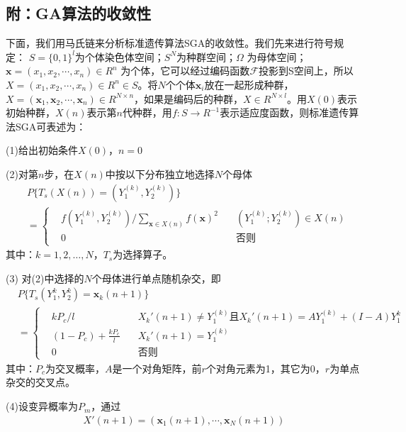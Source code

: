    \subsection{附：GA算法的收敛性}
        \par
        下面，我们用马氏链来分析标准遗传算法SGA的收敛性。我们先来进行符号规定：
        $S={\{0,1\}}^l$为个体染色体空间；$S^N$为种群空间；$\Omega$ 为母体空间；$\mathbf{x}=(x_1,x_2,\cdots,x_n)\in R^n$ 为个体，它可以经过编码函数$\mathcal{F}$投影到S空间上，所以$X=(x_1,x_2,\cdots,x_n)\in R^n\in S$。将$N$个个体$\mathbf{x}_i$放在一起形成种群，$X=(\mathbf{x}_1,\mathbf{x}_2,\cdots,\mathbf{x}_n)\in R^{N\times n}$，如果是编码后的种群，$X\in R^{N\times l}$。用$X(0)$表示初始种群，$X(n)$表示第$n$代种群，用$f:S\to R^{-1}$表示适应度函数，则标准遗传算法SGA可表述为：
        \par
        (1)给出初始条件$X(0)$，$n=0$
        \par
        (2)对第$n$步，在$X(n)$中按以下分布独立地选择$N$个母体
        \begin{align*}
        &P\{T_s(X(n))=(Y_1^{(k)},Y_2^{(k)})\}\\
        &=\left\{
        \begin{aligned}
        &f\left(Y_1^{(k)},Y_2^{(k)}\right)\bigg/{\mathop{\sum}\limits_{\mathbf{x}\in X(n)}f(\mathbf{x})^2}\quad & \left(Y_1^{(k)};Y_2^{(k)}\right)\in X(n)\\
        &0\quad &\text{否则}
        \end{aligned}
        \right.
        \end{align*}
        其中：$k=1,2,\dots,N$，$T_s$为选择算子。
        \par
        (3) 对(2)中选择的$N$个母体进行单点随机杂交，即
        \begin{align*}
        &P\{T_s(Y_1^{k},Y_2^{k})=\mathbf{x}_k(n+1)\}\\
        &=\left\{
        \begin{aligned}
        &kP_c/l\quad & X_k'(n+1)\neq Y_1^{(k)}\text{且}X_k'(n+1)=AY_1^{(k)}+(I-A)Y_1^k\\
        &(1-P_c)+\frac{kP_c}{l}\quad &X_k'(n+1)=Y_1^{(k)}\\
        &0\quad &\text{否则}
        \end{aligned}
        \right.
        \end{align*}
        其中：$P_c$为交叉概率，$A$是一个对角矩阵，前$r$个对角元素为1，其它为0，$r$为单点杂交的交叉点。
        \par
        (4)设变异概率为$P_m$，通过
        \begin{align*}
        X'(n+1)=(\mathbf{x}_1(n+1),\cdots,\mathbf{x}_N(n+1))
        \end{align*}

